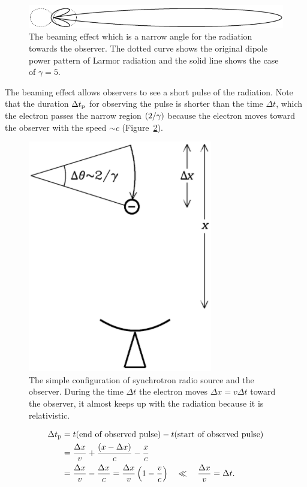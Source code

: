 \begin{figure}[htbp]
	\centering
	\includegraphics[width=.7\linewidth]{Chapter_2/Figures/NRAO_radio5n3.png}
    \caption[The schematic picture of relativistic aberration]{\label{fig:nrao_radio5n3}
        The beaming effect which is a narrow angle for the radiation towards the observer.
        The dotted curve shows the original dipole power pattern of Larmor radiation and the solid line shows the case of $\gamma = 5$.
    }
\end{figure}

The beaming effect allows observers to see a short pulse of the radiation.
Note that the duration $\Delta t_{\mathrm{p}}$ for observing the pulse is shorter than the time $\Delta t$, which the electron passes the narrow region $\left(2/\gamma\right)$ because the electron moves toward the observer with the speed $\sim c$ (Figure~\ref{fig:nrao_radio5n4}).

\begin{figure}[htbp]
	\centering
	\includegraphics[width=.4\linewidth]{Chapter_2/Figures/NRAO_radio5n4.png}
    \caption[Simple condiguration of the synchrotron source and observer]{\label{fig:nrao_radio5n4}
        The simple configuration of synchrotron radio source and the observer.
        During the time $\Delta t$ the electron moves $\Delta x = v\Delta t$ toward the observer, it almost keeps up with the radiation because it is relativistic.
    }
\end{figure}

\begin{equation}\label{eq:essential_radio5n54}
    \begin{aligned}
        \Delta t_{\mathrm{p}} &=t(\text{end of observed pulse})-t(\text{start of observed pulse}) \\
                              &=\frac{\Delta x}{v}+\frac{(x-\Delta x)}{c}-\frac{x}{c} \\
                              &= \frac{\Delta x}{v}-\frac{\Delta x}{c}=\frac{\Delta x}{v}\left(1-\frac{v}{c}\right) \quad \ll \quad \frac{\Delta x}{v}=\Delta t.
    \end{aligned}
\end{equation}


